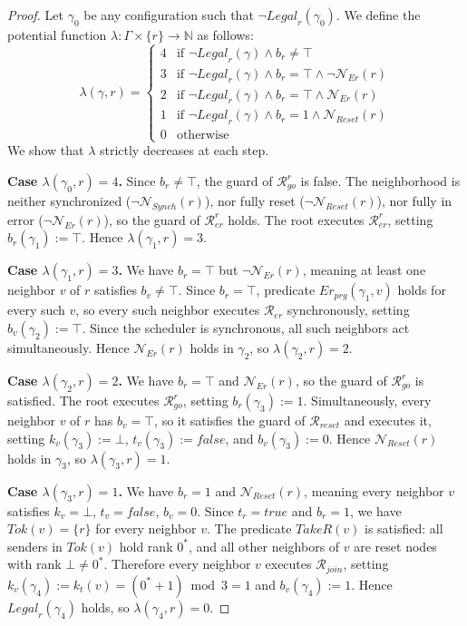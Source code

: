 \documentclass[a4paper, 12pt]{article}
\newcommand{\rk}{k}
\newcommand{\Rer}{$\mathscr{R}_{er}$}
\newcommand{\Rreset}{$\mathscr{R}_{reset}$}
\newcommand{\Rjoin}{$\mathscr{R}_{join}$}
\newcommand{\RerRoot}{$\mathscr{R}^r_{er}$}
\newcommand{\Rgo}{$\mathscr{R}^r_{go}$}
\begin{document}
\begin{proof}
Let $\gamma_0$ be any configuration such that 
$\neg\mathit{Legal}_r(\gamma_0)$. We define the potential function 
$\lambda : \Gamma \times \{r\} \to \mathbb{N}$ as follows:
\[
\lambda(\gamma, r) =
\begin{cases}
4 & \text{if } \neg\mathit{Legal}_r(\gamma) \wedge b_r \neq \top \\
3 & \text{if } \neg\mathit{Legal}_r(\gamma) \wedge b_r = \top 
      \wedge \neg\mathcal{N}_{Er}(r) \\
2 & \text{if } \neg\mathit{Legal}_r(\gamma) \wedge b_r = \top 
      \wedge \mathcal{N}_{Er}(r) \\
1 & \text{if } \neg\mathit{Legal}_r(\gamma) \wedge b_r = 1 
      \wedge \mathcal{N}_{Reset}(r) \\
0 & \text{otherwise}
\end{cases}
\]
We show that $\lambda$ strictly decreases at each step.

\medskip
\noindent\textbf{Case $\lambda(\gamma_0, r) = 4$.}
Since $b_r \neq \top$, the guard of \Rgo\/  is false. The neighborhood 
is neither synchronized ($\neg\mathcal{N}_{Synch}(r)$), nor fully reset 
($\neg\mathcal{N}_{Reset}(r)$), nor fully in error 
($\neg\mathcal{N}_{Er}(r)$), so the guard of \RerRoot\/ holds. The root 
executes \RerRoot, setting $b_r(\gamma_1) := \top$. Hence 
$\lambda(\gamma_1, r) = 3$.

\medskip
\noindent\textbf{Case $\lambda(\gamma_1, r) = 3$.}
We have $b_r = \top$ but $\neg\mathcal{N}_{Er}(r)$, meaning at least 
one neighbor $v$ of $r$ satisfies $b_v \neq \top$. Since $b_r = \top$, 
predicate $Er_{prg}(\gamma_1, v)$ holds for every such $v$, so every 
such neighbor executes \Rer\/ synchronously, setting 
$b_v(\gamma_2) := \top$. Since the scheduler is synchronous, all such 
neighbors act simultaneously. Hence $\mathcal{N}_{Er}(r)$ holds in 
$\gamma_2$, so $\lambda(\gamma_2, r) = 2$.

\medskip
\noindent\textbf{Case $\lambda(\gamma_2, r) = 2$.}
We have $b_r = \top$ and $\mathcal{N}_{Er}(r)$, so the guard of \Rgo\/  
is satisfied. The root executes \Rgo, setting $b_r(\gamma_3) := 1$. 
Simultaneously, every neighbor $v$ of $r$ has $b_v = \top$, so it 
satisfies the guard of \Rreset\/ and executes it, setting 
$\rk_v(\gamma_3) := \bot$, $t_v(\gamma_3) := \mathit{false}$, and 
$b_v(\gamma_3) := 0$. Hence $\mathcal{N}_{Reset}(r)$ holds in $\gamma_3$, 
so $\lambda(\gamma_3, r) = 1$.

\medskip
\noindent\textbf{Case $\lambda(\gamma_3, r) = 1$.}
We have $b_r = 1$ and $\mathcal{N}_{Reset}(r)$, meaning every neighbor 
$v$ satisfies $\rk_v = \bot$, $t_v = \mathit{false}$, $b_v = 0$. Since 
$t_r = \mathit{true}$ and $b_r = 1$, we have $\mathit{Tok}(v) = \{r\}$ 
for every neighbor $v$. The predicate $\mathit{TakeR}(v)$ is satisfied: 
all senders in $\mathit{Tok}(v)$ hold rank $0^*$, and all other neighbors 
of $v$ are reset nodes with rank $\bot \neq 0^*$. Therefore every 
neighbor $v$ executes \Rjoin\/, setting 
$\rk_v(\gamma_4) := \rk_t(v) = (0^* + 1) \bmod 3 = 1$ and 
$b_v(\gamma_4) := 1$. Hence $\mathit{Legal}_r(\gamma_4)$ holds, so 
$\lambda(\gamma_4, r) = 0$.


\end{proof}
\end{document}
